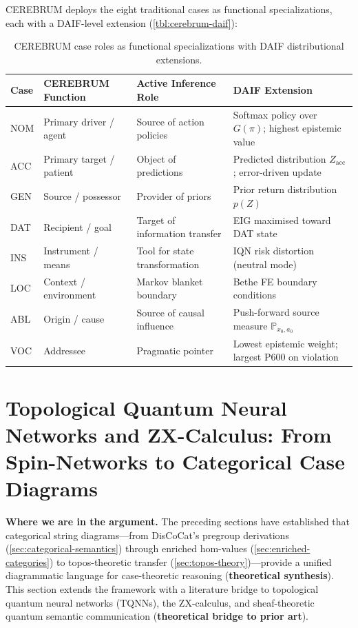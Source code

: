 \documentclass[
]{article}
\begin{document}
CEREBRUM deploys the eight traditional cases as functional
specializations, each with a DAIF-level extension
(\autoref{tbl:cerebrum-daif}):

\begin{table}[htbp]
\centering
\begin{tabular}{@{}l p{} p{} p{}@{}}
\toprule
\textbf{Case} & \textbf{CEREBRUM Function} & \textbf{Active Inference Role} & \textbf{DAIF Extension} \\
\midrule
NOM & Primary driver / agent & Source of action policies & Softmax policy over $G{(\pi)}$; highest epistemic value \\
ACC & Primary target / patient & Object of predictions & Predicted distribution $Z_{\text{acc}}$; error-driven update \\
GEN & Source / possessor & Provider of priors & Prior return distribution $p(Z)$ \\
DAT & Recipient / goal & Target of information transfer & EIG maximised toward DAT state \\
INS & Instrument / means & Tool for state transformation & IQN risk distortion (neutral mode) \\
LOC & Context / environment & Markov blanket boundary & Bethe FE boundary conditions \\
ABL & Origin / cause & Source of causal influence & Push-forward source measure $\mathbb{P}_{x_0,a_0}$ \\
VOC & Addressee & Pragmatic pointer & Lowest epistemic weight; largest P600 on violation \\
\bottomrule
\end{tabular}
\caption{CEREBRUM case roles as functional specializations with DAIF distributional extensions.}
\label{tbl:cerebrum-daif}
\end{table}

\newpage

\section{Topological Quantum Neural Networks and ZX-Calculus: From
Spin-Networks to Categorical Case
Diagrams}\label{sec:quantum-active-inference}

\textbf{Where we are in the argument.} The preceding sections have
established that categorical string diagrams---from DisCoCat's pregroup
derivations (\autoref{sec:categorical-semantics}) through enriched
hom-values (\autoref{sec:enriched-categories}) to topos-theoretic
transfer (\autoref{sec:topos-theory})---provide a unified diagrammatic
language for case-theoretic reasoning (\textbf{theoretical synthesis}).
This section extends the framework with a literature bridge to
topological quantum neural networks (TQNNs), the ZX-calculus, and
sheaf-theoretic quantum semantic communication (\textbf{theoretical
bridge to prior art}).
\end{document}
